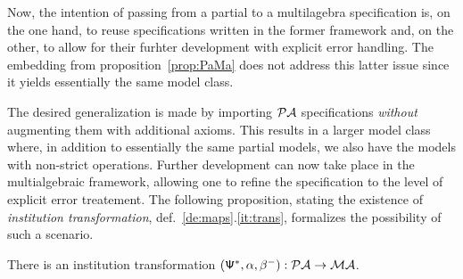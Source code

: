\documentclass[10pt]{article}
\begin{document}
Now, the intention of passing from a partial to a multilagebra specification
is, on the one hand, to reuse specifications written in the former
framework and, on the other, to allow for their furhter development with
explicit error handling. The embedding from
proposition~\ref{prop:PaMa} does not address this latter issue since it
yields essentially the same model class. 

The desired generalization is made by importing ${\mathcal{PA}}$ specifications
{\em without} augmenting them with additional axioms. 
This results in a larger model class where, in
addition to essentially the same partial models, we also have the models
with non-strict operations.
Further development can now take
place in the multialgebraic framework, allowing one to refine the
specification to the level of explicit error treatement.
The following proposition, stating the existence of {\em institution
transformation}, def.~\ref{de:maps}.\ref{it:trans}, formalizes the possibility of such a
scenario. 
\begin{proposition}\label{prop:PaMaT}
There is an institution transformation $({\sf {\Psi}}^*,\alpha,
\beta^{-}):{\mathcal{PA}} \to {\mathcal{MA}}$.
\end{proposition}
%
\end{document}
